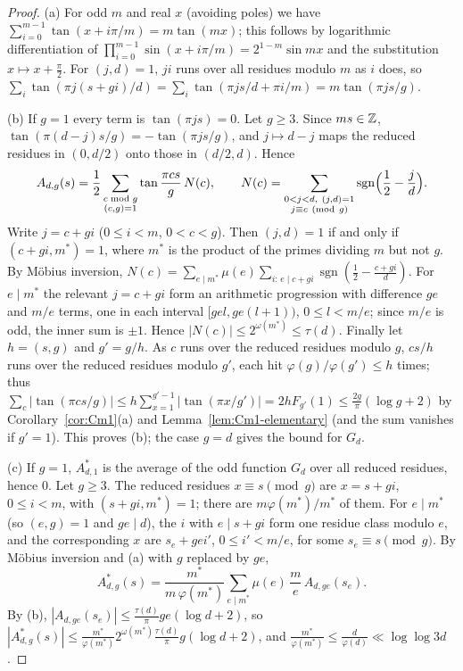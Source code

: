 \begin{proof}
(a) For odd $m$ and real $x$ (avoiding poles) we have $\sum_{i=0}^{m-1}\tan(x+i\pi/m)=m\tan(mx)$; this follows by logarithmic differentiation of $\prod_{i=0}^{m-1}\sin(x+i\pi/m)=2^{1-m}\sin mx$ and the substitution $x\mapsto x+\frac{\pi}{2}$. For $(j,d)=1$, $ji$ runs over all residues modulo $m$ as $i$ does, so $\sum_i\tan(\pi j(s+gi)/d)=\sum_i\tan(\pi js/d+\pi i/m)=m\tan(\pi js/g)$.

(b) If $g=1$ every term is $\tan(\pi js)=0$. Let $g\ge 3$. Since $ms\in\mathbb{Z}$, $\tan(\pi(d-j)s/g)=-\tan(\pi js/g)$, and $j\mapsto d-j$ maps the reduced residues in $(0,d/2)$ onto those in $(d/2,d)$. Hence
\[
A_{d,g}(s)=\frac12\sum_{\substack{c\bmod g\\ (c,g)=1}}\tan\frac{\pi cs}{g}\,N(c),\qquad
N(c)=\sum_{\substack{0<j<d,\ (j,d)=1\\ j\equiv c\ (\mathrm{mod}\ g)}}\operatorname{sgn}\Bigl(\frac12-\frac jd\Bigr).
\]
Write $j=c+gi$ ($0\le i<m$, $0<c<g$). Then $(j,d)=1$ if and only if $(c+gi,m^*)=1$, where $m^*$ is the product of the primes dividing $m$ but not $g$. By M\"obius inversion, $N(c)=\sum_{e\mid m^*}\mu(e)\sum_{i:\,e\mid c+gi}\operatorname{sgn}(\frac12-\frac{c+gi}{d})$. For $e\mid m^*$ the relevant $j=c+gi$ form an arithmetic progression with difference $ge$ and $m/e$ terms, one in each interval $[gel,ge(l+1))$, $0\le l<m/e$; since $m/e$ is odd, the inner sum is $\pm1$. Hence $|N(c)|\le 2^{\omega(m^*)}\le\tau(d)$. Finally let $h=(s,g)$ and $g'=g/h$. As $c$ runs over the reduced residues modulo $g$, $cs/h$ runs over the reduced residues modulo $g'$, each hit $\varphi(g)/\varphi(g')\le h$ times; thus $\sum_c|\tan(\pi cs/g)|\le h\sum_{x=1}^{g'-1}|\tan(\pi x/g')|=2hF_{g'}(1)\le\frac{2g}{\pi}(\log g+2)$ by Corollary~\ref{cor:Cm1}(a) and Lemma~\ref{lem:Cm1-elementary} (and the sum vanishes if $g'=1$). This proves (b); the case $g=d$ gives the bound for $G_d$.

(c) If $g=1$, $A^*_{d,1}$ is the average of the odd function $G_d$ over all reduced residues, hence 0. Let $g\ge 3$. The reduced residues $x\equiv s\pmod g$ are $x=s+gi$, $0\le i<m$, with $(s+gi,m^*)=1$; there are $m\varphi(m^*)/m^*$ of them. For $e\mid m^*$ (so $(e,g)=1$ and $ge\mid d$), the $i$ with $e\mid s+gi$ form one residue class modulo $e$, and the corresponding $x$ are $s_e+gei'$, $0\le i'<m/e$, for some $s_e\equiv s\pmod g$. By M\"obius inversion and (a) with $g$ replaced by $ge$,
\[
A^*_{d,g}(s)=\frac{m^*}{m\,\varphi(m^*)}\sum_{e\mid m^*}\mu(e)\,\frac me\,A_{d,ge}(s_e).
\]
By (b), $|A_{d,ge}(s_e)|\le\frac{\tau(d)}{\pi}ge(\log d+2)$, so $|A^*_{d,g}(s)|\le\frac{m^*}{\varphi(m^*)}2^{\omega(m^*)}\frac{\tau(d)}{\pi}g(\log d+2)$, and $\frac{m^*}{\varphi(m^*)}\le\frac{d}{\varphi(d)}\ll\log\log 3d$.
\end{proof}


